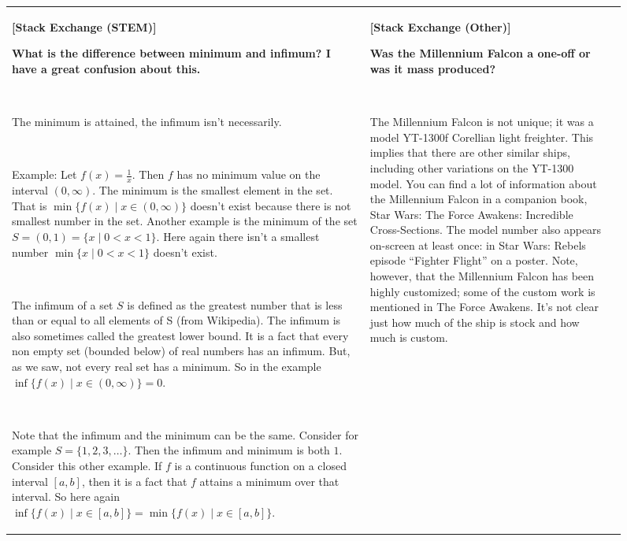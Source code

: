 \documentclass{article}
\begin{document}
\begin{figure}[p]
    \scriptsize
    \centering
    \begin{tabular}{@{}p{}p{}p{}@{}}
    \toprule
    \textbf{[Stack Exchange (STEM)]}
    
    \textcolor[HTML]{3078BE}{\textbf{What is the difference between minimum and infimum? I have a great confusion about this.}}
    
    ~
    
    The minimum is attained, the infimum isn't necessarily. 

    ~
    
    Example: Let $f(x) = \frac{1}{x}$. Then $f$ has no minimum value on the interval $(0,\infty)$. The minimum is the smallest element in the set. That is $\min\{f(x)\mid x\in (0,\infty)\}$ doesn't exist because there is not smallest number in the set. Another example is the minimum of the set $S = (0,1) = \{x\mid 0<x<1\}$. Here again there isn't a smallest number $\min\{x\mid 0<x<1\}$ doesn't exist.

    ~
    
    The infimum of a set $S$ is defined as the greatest number that is less than or equal to all elements of S (from Wikipedia). The infimum is also sometimes called the greatest lower bound.
    It is a fact that every non empty set (bounded below) of real numbers has an infimum. But, as we saw, not every real set has a minimum.
    So in the example $\inf\{f(x)\mid x\in (0,\infty)\} = 0.$

    ~
    
    Note that the infimum and the minimum can be the same. Consider for example $S = \{1,2,3,\dots\}$. Then the infimum and minimum is both $1$.
    Consider this other example. If $f$ is a continuous function on a closed interval $[a,b]$,  then it is a fact that $f$ attains a minimum over that interval. So here again $\inf\{f(x)\mid x\in [a,b]\} = \min\{f(x)\mid x\in [a,b]\}$.
    
    &
    \textbf{[Stack Exchange (Other)]}
    
    \textcolor[HTML]{3078BE}{\textbf{Was the Millennium Falcon a one-off or was it mass produced?}}
    
    ~
    
    The Millennium Falcon is not unique; it was a model YT-1300f Corellian light freighter. This implies that there are other similar ships, including other variations on the YT-1300 model. You can find a lot of information about the Millennium Falcon in a companion book, Star Wars: The Force Awakens: Incredible Cross-Sections. The model number also appears on-screen at least once: in Star Wars: Rebels episode ``Fighter Flight'' on a poster. Note, however, that the Millennium Falcon has been highly customized; some of the custom work is mentioned in The Force Awakens. It's not clear just how much of the ship is stock and how much is custom.


\end{tabular}
\end{figure}
\end{document}
